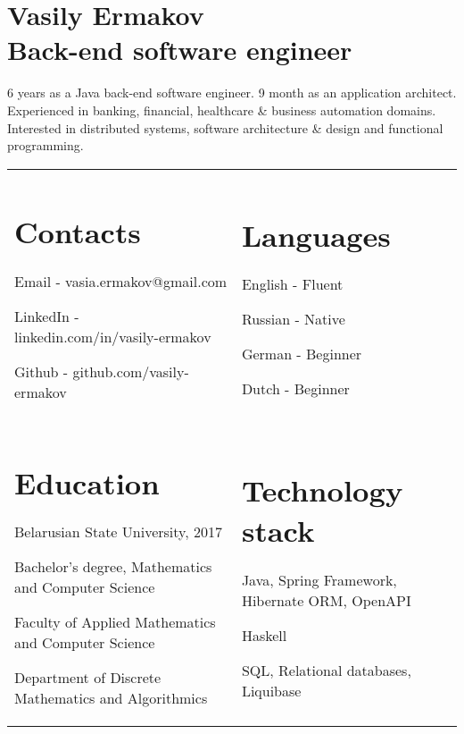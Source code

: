 \documentclass{article}
\begin{document}
    \section*{Vasily Ermakov\\Back-end software engineer}
    6 years as a Java back-end software engineer. 9 month as an application architect.\\
    Experienced in banking, financial, healthcare \& business automation domains.\\
    Interested in distributed systems, software architecture \& design and functional programming.\\
    \begin{tabular}{p{275pt} p{275pt}}
        \section*{Contacts}
        Email - vasia.ermakov@gmail.com

        LinkedIn - linkedin.com/in/vasily-ermakov

        Github - github.com/vasily-ermakov
        &
        \section*{Languages}
        English - Fluent

        Russian - Native

        German - Beginner

        Dutch - Beginner\\
        \section*{Education}

        Belarusian State University, 2017

        Bachelor's degree, Mathematics and Computer Science

        Faculty of Applied Mathematics and Computer Science

        Department of Discrete Mathematics and Algorithmics
        &
        \section*{Technology stack}
        Java, Spring Framework, Hibernate ORM, OpenAPI

        Haskell

        SQL, Relational databases, Liquibase


\end{tabular}
\end{document}

